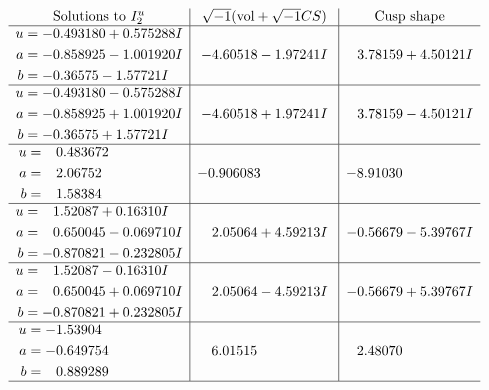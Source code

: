 \documentclass[1p]{elsarticle_modified}
\theoremstyle{definition}
\newcommand{\I}{\sqrt{-1}}
\begin{document}
$$\begin{array}{c|c|c}  
\text{Solutions to }I^u_{2}& \I (\text{vol} + \sqrt{-1}CS) & \text{Cusp shape}\\
 \hline 
\begin{aligned}
u &= -0.493180 + 0.575288 I \\
a &= -0.858925 - 1.001920 I \\
b &= -0.36575 - 1.57721 I\end{aligned}
 & -4.60518 - 1.97241 I & \phantom{-}3.78159 + 4.50121 I \\ \hline\begin{aligned}
u &= -0.493180 - 0.575288 I \\
a &= -0.858925 + 1.001920 I \\
b &= -0.36575 + 1.57721 I\end{aligned}
 & -4.60518 + 1.97241 I & \phantom{-}3.78159 - 4.50121 I \\ \hline\begin{aligned}
u &= \phantom{-}0.483672\phantom{ +0.000000I} \\
a &= \phantom{-}2.06752\phantom{ +0.000000I} \\
b &= \phantom{-}1.58384\phantom{ +0.000000I}\end{aligned}
 & -0.906083\phantom{ +0.000000I} & -8.91030\phantom{ +0.000000I} \\ \hline\begin{aligned}
u &= \phantom{-}1.52087 + 0.16310 I \\
a &= \phantom{-}0.650045 - 0.069710 I \\
b &= -0.870821 - 0.232805 I\end{aligned}
 & \phantom{-}2.05064 + 4.59213 I & -0.56679 - 5.39767 I \\ \hline\begin{aligned}
u &= \phantom{-}1.52087 - 0.16310 I \\
a &= \phantom{-}0.650045 + 0.069710 I \\
b &= -0.870821 + 0.232805 I\end{aligned}
 & \phantom{-}2.05064 - 4.59213 I & -0.56679 + 5.39767 I \\ \hline\begin{aligned}
u &= -1.53904\phantom{ +0.000000I} \\
a &= -0.649754\phantom{ +0.000000I} \\
b &= \phantom{-}0.889289\phantom{ +0.000000I}\end{aligned}
 & \phantom{-}6.01515\phantom{ +0.000000I} & \phantom{-}2.48070\phantom{ +0.000000I}\\
 \hline 
 \end{array}$$\newpage
\end{document}
